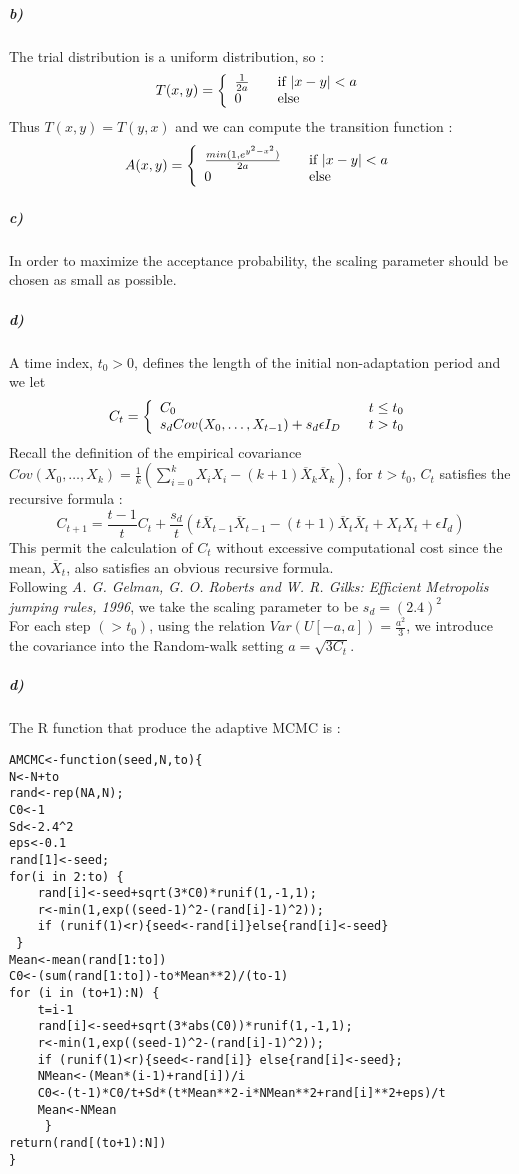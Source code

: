 \documentclass{article}
\begin{document}
\subparagraph{b)}
The trial distribution is a uniform distribution, so :\\
$$T(x,y) = \left\{ 
\begin{array}{l l}
  \frac{1}{2a} & \quad \text{if $|x-y|<a$}\\
  0 & \quad \mbox{else}\\ \end{array} \right.$$
   Thus $T(x,y)=T(y,x)$ and we can compute the transition function :
$$A(x,y) = \left\{ 
\begin{array}{l l}
  \frac{min(1,e^{y^2-x^2})}{2a} & \quad \text{if $|x-y|<a$}\\
  0 & \quad \text{else}\\ \end{array} \right. 
$$
\subparagraph{c)}
In order to maximize the acceptance probability, the scaling parameter should be chosen as small as possible.
\subparagraph{d)}
A time index, $t_0>0$, defines the length of the initial non-adaptation period and we let 
$$C_t = \left\{ 
\begin{array}{l l}
  C_0 & \quad t \leq t_0 \\
  s_d Cov(X_0, \ldots, X_{t-1}) + s_d \epsilon I_D & \quad t > t_0\\ \end{array} \right. 
$$
 Recall the definition of the empirical covariance  $Cov(X_0, \ldots, X_k)=\frac{1}{k} \left( 
\sum_{i=0}^k X_i X_i- (k+1)\overline{X}_{k}\overline{X}_{k} \right) $, for $t > t_0 $, $C_t$ satisfies the recursive formula : 
$$ C_{t+1}=\frac{t-1}{t}C_t+\dfrac{s_d}{t}\left(t\overline{X}_{t-1} \overline{X}_{t-1}-(t+1)\overline{X}_{t} \overline{X}_{t}+X_t X_t + \epsilon I_d \right) $$
This permit the calculation of $C_t$ without excessive computational cost since the mean, $\overline{X}_t$, also satisfies an obvious recursive formula.\\
Following \textit{A. G. Gelman, G. O. Roberts and W. R. Gilks: Efficient Metropolis jumping rules, 1996}, we take the scaling parameter to be $s_d=(2.4)^2$  \\
For each step $(>t_0)$, using the relation $Var(U[-a,a])=\frac{a^2}{3}$, we introduce the covariance into the Random-walk setting $a=\sqrt{3C_t}$. 
\subparagraph{d)}
The R function that produce the adaptive MCMC is :
\begin{verbatim}
AMCMC<-function(seed,N,to){
N<-N+to
rand<-rep(NA,N);
C0<-1
Sd<-2.4^2
eps<-0.1
rand[1]<-seed;
for(i in 2:to) {
	rand[i]<-seed+sqrt(3*C0)*runif(1,-1,1);
	r<-min(1,exp((seed-1)^2-(rand[i]-1)^2));
	if (runif(1)<r){seed<-rand[i]}else{rand[i]<-seed}
 }
Mean<-mean(rand[1:to])
C0<-(sum(rand[1:to])-to*Mean**2)/(to-1)
for (i in (to+1):N) {
	t=i-1
	rand[i]<-seed+sqrt(3*abs(C0))*runif(1,-1,1);
	r<-min(1,exp((seed-1)^2-(rand[i]-1)^2));
	if (runif(1)<r){seed<-rand[i]} else{rand[i]<-seed};
	NMean<-(Mean*(i-1)+rand[i])/i
	C0<-(t-1)*C0/t+Sd*(t*Mean**2-i*NMean**2+rand[i]**2+eps)/t
	Mean<-NMean
     }
return(rand[(to+1):N])
}
\end{verbatim}
\end{document}
